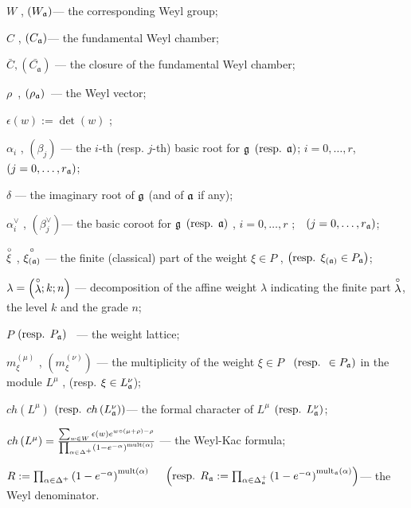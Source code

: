 $W$ , $\left( W_{\mathfrak{a}}\right) $--- the corresponding Weyl group;

$C$ , $\left( C_{\mathfrak{a}}\right) $--- the fundamental Weyl chamber;

$\bar{C}, \left(\bar{C_{\mathfrak{a}}}\right)$ --- the closure of the fundamental Weyl chamber;

$\rho $\ , $\left( \rho _{\mathfrak{a}}\right) $\ --- the Weyl vector;

$\epsilon \left( w\right) :=\det \left( w\right) $ ;

$\alpha _{i}$ , $\left( \beta _{j}\right) $ --- the $i
$-th (resp. $j$-th) basic root for $\frak{g}$ $\left( \mbox{resp. }\af%
\right) $; $i=0,\ldots ,r$,\ \ $\left( j=0,\ldots ,r_{\mathfrak{a}}\right) $;

$\delta $ --- the imaginary root of $\frak{g}$ (and of $\mathfrak{a}$ if any);

$\alpha _{i}^{\vee }$ , $\left( \beta _{j}^{\vee
}\right) $--- the basic coroot for $\frak{g}$ $\left( \mbox{resp. }\af%
\right) $ , $i=0,\ldots ,r$ ;\ \ $\left( j=0,\ldots ,r_{\mathfrak{a}}\right) $;

$\stackrel{\circ }{\xi }$ , $\stackrel{\circ }{\xi _{\left( \mathfrak{a}\right) }}$
--- the finite (classical) part of the weight $\xi \in P$ , $\left( \mbox{%
resp. }\xi _{\left( \af\right) }\in P_{\af}\right) $;

$\lambda =\left( \stackrel{\circ }{\lambda };k;n\right) $ ---
decomposition of the affine weight $\lambda$ indicating the finite
part $\stackrel{\circ }{\lambda }$, the level $k$ and the grade $n$;

$P$ $\left( \mbox{resp. } P_{\mathfrak{a}}\right) $ \ --- the weight lattice;

$m_{\xi }^{\left( \mu \right) }$ , $\left( m_{\xi }^{\left( \nu \right)
}\right) $ --- the multiplicity of the weight $\xi \in P$ \ $\left( \mbox{%
resp. }\in P_{\af}\right) $ in the module $L^{\mu }$ , (resp. $\xi \in
L_{\mathfrak{a}}^{\nu } $);

$ch\left( L^{\mu }\right) $ $\left( \mbox{resp. }ch\left( L_{\mathfrak{a}}^{\nu
}\right) \right) $--- the formal character of $L^{\mu }$ $\left( \mbox{resp. }%
L_{\af}^{\nu }\right) $;

$ch\left( L^{\mu }\right) =\frac{\sum_{w\in W}\epsilon (w)e^{w\circ (\mu
+\rho )-\rho }}{\prod_{\alpha \in \Delta ^{+}}\left( 1-e^{-\alpha }\right) ^{%
\mathrm{{mult}\left( \alpha \right) }}}$ --- the Weyl-Kac formula;

$R:=\prod_{\alpha \in \Delta ^{+}}\left( 1-e^{-\alpha }\right) ^{\mathrm{{%
mult}\left( \alpha \right) }}\quad $
$\left( \mbox{resp. }R_{\af}:=\prod_{\alpha \in \Delta _{%
\af}^{+}}\left( 1-e^{-\alpha }\right) ^{\mathrm{mult}_{\af}\mathrm{%
\left( \alpha \right) }}\right) $--- the Weyl denominator.




